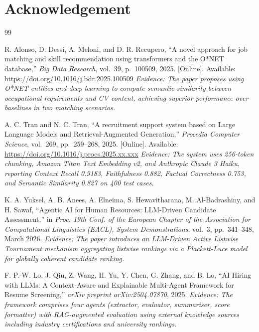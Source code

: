 \documentclass[journal]{IEEEtran}
\begin{document}
\section*{Acknowledgement}


\begin{thebibliography}{99}

R. Alonso, D. Dessí, A. Meloni, and D. R. Recupero,
``A novel approach for job matching and skill recommendation using transformers
and the O*NET database,''
\textit{Big Data Research}, vol.~39, p.~100509, 2025.
[Online]. Available: \url{https://doi.org/10.1016/j.bdr.2025.100509}
\textit{Evidence: The paper proposes using O*NET entities and deep learning to
compute semantic similarity between occupational requirements and CV content,
achieving superior performance over baselines in two matching scenarios.}

A. C. Tran and N. C. Tran,
``A recruitment support system based on Large Language Models and
Retrieval-Augmented Generation,''
\textit{Procedia Computer Science}, vol.~269, pp.~259--268, 2025.
[Online]. Available: \url{https://doi.org/10.1016/j.procs.2025.xx.xxx}
\textit{Evidence: The system uses 256-token chunking, Amazon Titan Text Embedding
v2, and Anthropic Claude 3 Haiku, reporting Context Recall 0.9183, Faithfulness
0.882, Factual Correctness 0.753, and Semantic Similarity 0.827 on 400 test cases.}

K. A. Yuksel, A. B. Anees, A. Elneima, S. Hewavitharana, M. Al-Badrashiny,
and H. Sawaf,
``Agentic AI for Human Resources: LLM-Driven Candidate Assessment,''
in \textit{Proc. 19th Conf. of the European Chapter of the Association for
Computational Linguistics (EACL), System Demonstrations}, vol.~3, pp.~341--348,
March 2026.
\textit{Evidence: The paper introduces an LLM-Driven Active Listwise Tournament
mechanism aggregating listwise rankings via a Plackett-Luce model for globally
coherent candidate ranking.}

F. P.-W. Lo, J. Qiu, Z. Wang, H. Yu, Y. Chen, G. Zhang, and B. Lo,
``AI Hiring with LLMs: A Context-Aware and Explainable Multi-Agent Framework
for Resume Screening,''
\textit{arXiv preprint arXiv:2504.07870}, 2025.
\textit{Evidence: The framework comprises four agents (extractor, evaluator,
summariser, score formatter) with RAG-augmented evaluation using external
knowledge sources including industry certifications and university rankings.}


\end{thebibliography}
\end{document}
